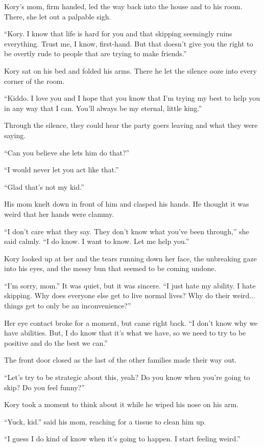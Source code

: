 Kory's mom, firm handed, led the way back into the house and to his room. There, she let out a palpable sigh.

``Kory. I know that life is hard for you and that skipping seemingly ruins everything. Trust me, I know, first-hand. But that doesn't give you the right to be overtly rude to people that are trying to make friends.''

Kory sat on his bed and folded his arms. There he let the silence ooze into every corner of the room.

``Kiddo. I love you and I hope that you know that I'm trying my best to help you in any way that I can. You'll always be my eternal, little king.''

Through the silence, they could hear the party goers leaving and what they were saying.

``Can you believe she lets him do that?''

``I would never let you act like that.''

``Glad that's not my kid.''

His mom knelt down in front of him and clasped his hands. He thought it was weird that her hands were clammy.

``I don't care what they say. They don't know what you've been through,'' she said calmly. ``I do know. I want to know. Let me help you.''

Kory looked up at her and the tears running down her face, the unbreaking gaze into his eyes, and the messy bun that seemed to be coming undone.

``I'm sorry, mom.'' It was quiet, but it was sincere. ``I just hate my ability. I hate skipping. Why does everyone else get to live normal lives? Why do their weird... things get to only be an inconvenience?''

Her eye contact broke for a moment, but came right back. ``I don't know why we have abilities. But, I do know that it's what we have, so we need to try to be positive and do the best we can.''

The front door closed as the last of the other families made their way out.

``Let's try to be strategic about this, yeah? Do you know when you're going to skip? Do you feel funny?''

Kory took a moment to think about it while he wiped his nose on his arm.

``Yuck, kid.'' said his mom, reaching for a tissue to clean him up.

``I guess I do kind of know when it's going to happen. I start feeling weird.''

